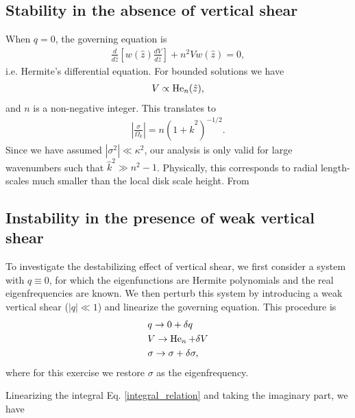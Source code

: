 \subsection{Stability in the absence of vertical shear}
When $q=0$, the governing equation is
\begin{align}
  \frac{d}{d\hat{z}}\left[w(\hat{z})\frac{dV}{d\hat{z}}\right] + n^2V
  w(\hat{z}) =0, 
\end{align}
i.e. Hermite's differential equation. For bounded solutions we have 
\begin{align}
  V\propto \operatorname{He}_n(\hat{z}),
\end{align}
and $n$ is a non-negative integer. This translates to
\begin{align}
  \left|\frac{\sigma}{\Omega_k}\right| = n
  \left(1+\hat{k}^2\right)^{-1/2}. 
\end{align}
Since we have assumed $|\sigma^2|\ll \kappa^2$, our analysis is only
valid for large wavenumbers such that $\hat{k}^2\gg 
n^2-1$. Physically, this corresponds to radial length-scales much
smaller than the local disk scale height. From   

\subsection{Instability in the presence of weak vertical shear}
To investigate the destabilizing effect of vertical shear, we first
consider a system with $q\equiv0$, for which the eigenfunctions are
Hermite polynomials and the real eigenfrequencies are known. We then
perturb this system by introducing a weak vertical shear ($|q|\ll1$)
and linearize the governing equation. This procedure is
\begin{align}   
  &q \to 0 + \delta q\\
  &V \to \operatorname{He}_n + \delta V \\
  &\sigma \to \sigma + \delta\sigma, 
\end{align}
where for this exercise we restore $\sigma$ as the eigenfrequency. 

Linearizing the integral Eq. \ref{integral_relation} and taking the
imaginary part, we have


   